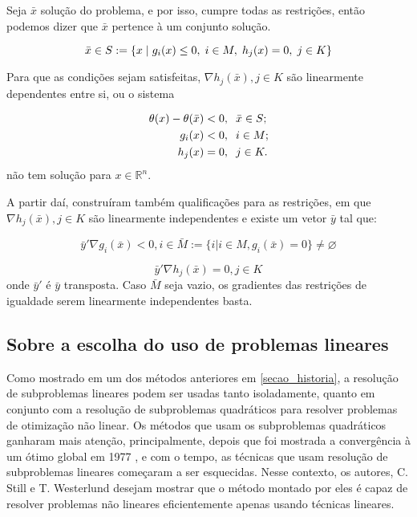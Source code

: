Seja \( \bar x \) solução do problema, e por isso, cumpre todas as restrições, então podemos
dizer que \(\bar x\) pertence à um conjunto solução.

\begin{equation}
    \bar x \in S :=\{ x \hspace{0.1cm} | \hspace{0.1cm} g_i(x) \leq 0, \hspace{0.1cm} i \in M, \hspace{0.1cm} h_j(x) = 0, \hspace{0.1cm} j \in K \}
\end{equation}


Para que as condições sejam satisfeitas, \( \nabla h_j(\bar x), j \in K\) são linearmente dependentes
entre si, ou o sistema

\begin{equation}
\begin{split}
  \theta(x) - \theta(\bar x) & < 0, \hspace{0.2cm} \bar x \in S; \\
  g_i(x)                     & < 0, \hspace{0.2cm} i \in M; \\
  h_j(x)                     & = 0, \hspace{0.2cm} j \in K.
\end{split}
\end{equation}
não tem solução para \( x \in \mathbb{R}^n \).


A partir daí, construíram também qualificações para as restrições, em que \( \nabla h_j(\bar x), j \in K\)
são linearmente independentes e existe um vetor \(\bar y\) tal que:

\begin{equation}
  \bar y' \nabla g_i(\bar x) < 0, i \in \bar M := \{i | i \in M, g_i(\bar x) = 0 \} \neq \varnothing
\end{equation}

\begin{equation}
\bar y' \nabla h_j(\bar x) = 0, j \in K
\end{equation}
onde \( \bar y' \) é \(\bar y\) transposta. Caso \(\bar M\) seja vazio, os gradientes das restrições
de igualdade serem linearmente independentes basta.




\subsection{Sobre a escolha do uso de problemas lineares}
Como mostrado em um dos métodos anteriores em \ref{secao_historia}, a resolução de subproblemas
lineares podem ser usadas tanto isoladamente, quanto em conjunto com a resolução de subproblemas
quadráticos para resolver problemas de otimização não linear. Os métodos que usam os subproblemas
quadráticos ganharam mais atenção, principalmente, depois que foi mostrada a convergência à um
ótimo global em 1977 \cite{han1977globally}, e com o tempo, as técnicas que usam resolução de
subproblemas lineares começaram a ser esquecidas. Nesse contexto, os autores, C. Still e
T. Westerlund desejam mostrar que o método montado por eles é capaz de resolver problemas não
lineares eficientemente apenas usando técnicas lineares.

